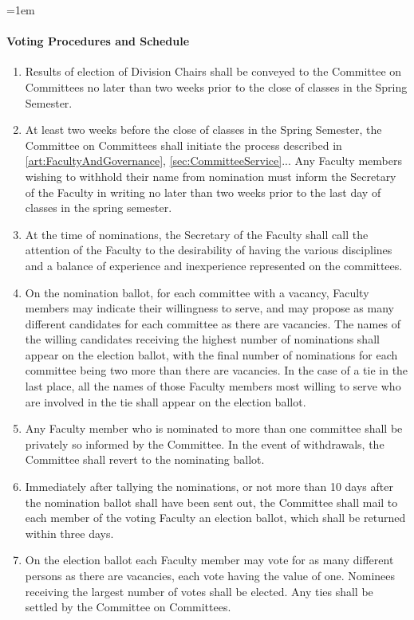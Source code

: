 \documentclass{manual}
\let\oldparagraph\paragraph
\renewcommand\paragraph{\leftskip=1em\oldparagraph}
\newcommand{\itemLevelA}{\alph*.}
\newcommand{\itemRefA}{\alph*}
\begin{document}
\paragraph{Voting Procedures and Schedule} \label{par:VotingProceduresAndSchedule}
\begin{enumerate}[label=\itemLevelA,ref=\itemRefA]
\item Results of election of Division Chairs shall be conveyed to the Committee on Committees no later than two weeks prior to the close of classes in the Spring Semester.
\item At least two weeks before the close of classes in the Spring Semester, the Committee on Committees shall initiate the process described in \cref{art:FacultyAndGovernance}, \cref{sec:CommitteeService}... Any Faculty members wishing to withhold their name from nomination must inform the Secretary of the Faculty in writing no later than two weeks prior to the last day of classes in the spring semester.
\item At the time of nominations, the Secretary of the Faculty shall call the attention of the Faculty to the desirability of having the various disciplines and a balance of experience and inexperience represented on the committees.
\item On the nomination ballot, for each committee with a vacancy,  Faculty members may indicate their willingness to serve, and may propose as many different candidates for each committee as there are vacancies. The names of the willing candidates receiving the highest number of nominations shall appear on the election ballot, with the final number of nominations for each committee being two more than there are vacancies. In the case of a tie in the last place, all the names of those Faculty members most willing to serve who are involved in the tie shall appear on the election ballot.

\item Any Faculty member who is nominated to more than one committee shall be privately so informed by the Committee. In the event of withdrawals, the Committee shall revert to the nominating ballot.
\item Immediately after tallying the nominations, or not more than 10 days after the nomination ballot shall have been sent out, the Committee shall mail to each member of the voting Faculty an election ballot, which shall be returned within three days.
\item On the election ballot each Faculty member may vote for as many different persons as there are vacancies, each vote having the value of one. Nominees receiving the largest number of votes shall be elected. Any ties shall be settled by the Committee on Committees.


\end{enumerate}
\end{document}

